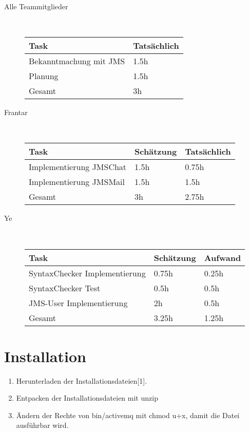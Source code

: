 \documentclass[11pt, a4paper]{article}
\begin{document}
\begin{description}
\item[Alle Teammitglieder] \hfill \\
  \begin{tabular} {| l | l |}
    \hline
    Task & Tatsächlich \\ \hline
    Bekanntmachung mit JMS & 1.5h \\ \hline
    Planung & 1.5h \\ \hline
    \hline
    Gesamt & 3h \\ \hline
  \end{tabular}

\item[Frantar] \hfill \\

  \begin{tabular} {| l | l | l |}
    \hline
    Task & Schätzung & Tatsächlich \\ \hline
    Implementierung JMSChat & 1.5h & 0.75h \\ \hline
    Implementierung JMSMail & 1.5h & 1.5h \\ \hline
    \hline
    Gesamt & 3h & 2.75h \\ \hline
  \end{tabular}

\item[Ye] \hfill \\
    \begin{tabular} {| l | l | l |}
      \hline
      Task & Schätzung & Aufwand \\ \hline
      SyntaxChecker Implementierung & 0.75h & 0.25h \\ \hline
      SyntaxChecker Test & 0.5h & 0.5h \\ \hline
      JMS-User Implementierung & 2h & 0.5h \\ \hline
      \hline
      Gesamt & 3.25h & 1.25h \\ \hline
    \end{tabular}
\end{description}

\section{Installation}
\begin{enumerate}
\item Herunterladen der Installationsdateien[1].
\item Entpacken der Installationsdateien mit unzip
\item Ändern der Rechte von bin/activemq mit chmod u+x, damit die Datei ausführbar wird.
\end{enumerate}
\newpage
\end{document}
